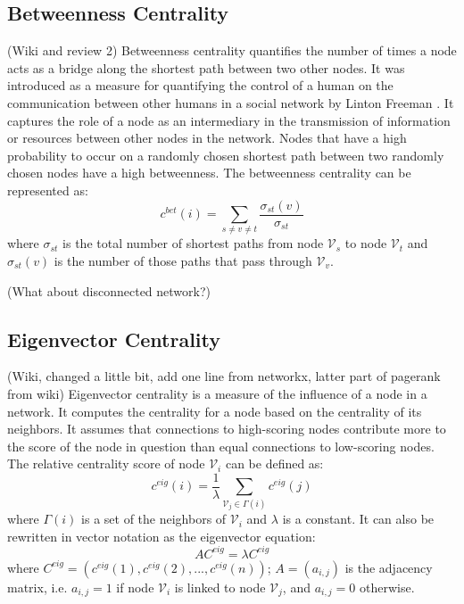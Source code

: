 \documentclass[\main/thesis.tex]{subfiles}
\begin{document}
\subsection{Betweenness Centrality}
(Wiki and review 2) Betweenness centrality quantifies the number of times a node acts as a bridge along the shortest path between two other nodes. It was introduced as a measure for quantifying the control of a human on the communication between other humans in a social network by Linton Freeman \cite{freeman1977set}. It captures the role of a node as an intermediary in the transmission of information or resources between other nodes in the network. Nodes that have a high probability to occur on a randomly chosen shortest path between two randomly chosen nodes have a high betweenness. The betweenness centrality can be represented as:
\begin{equation}
c^{bet}(i) = \sum_{s\neq v \neq t}\frac{\sigma_{st}(v)}{\sigma_{st}}
\end{equation}
where $\sigma_{st}$ is the total number of shortest paths from node $\mathcal{V}_s$ to node $\mathcal{V}_t$ and $\sigma_{st}(v)$ is the number of those paths that pass through $\mathcal{V}_v$.

(What about disconnected network?)
\subsection{Eigenvector Centrality}
(Wiki, changed a little bit, add one line from networkx, latter part of pagerank from wiki) Eigenvector centrality \cite{bonacich1987power} is a measure of the influence of a node in a network. It computes the centrality for a node based on the centrality of its neighbors. It assumes that connections to high-scoring nodes contribute more to the score of the node in question than equal connections to low-scoring nodes. The relative centrality score of node $\mathcal{V}_i$ can be defined as:
\begin{equation}
c^{eig}(i) = \frac{1}{\lambda}\sum_{\mathcal{V}_j\in \Gamma(i)}c^{eig}(j)
\end{equation}
where $\Gamma(i)$ is a set of the neighbors of $\mathcal{V}_i$ and $\lambda$ is a constant. It can also be rewritten in vector notation as the eigenvector equation:
\begin{equation}
AC^{eig}=\lambda C^{eig}
\end{equation}
where $C^{eig} = (c^{eig}(1),c^{eig}(2),...,c^{eig}(n))$; $A=(a_{i,j})$ is the adjacency matrix, i.e. $a_{i,j}=1$ if node $\mathcal{V}_i$ is linked to node $\mathcal{V}_j$, and $a_{i,j}=0$ otherwise.
\end{document}
